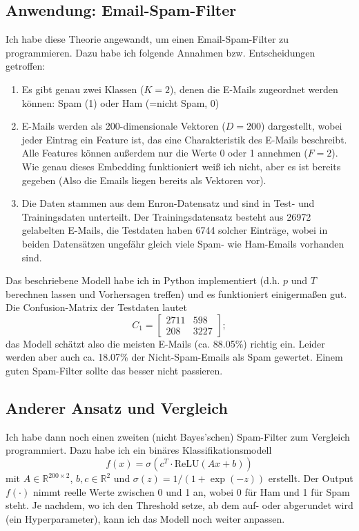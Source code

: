 \documentclass{article}
\begin{document}
\subsection{Anwendung: Email-Spam-Filter}
Ich habe diese Theorie angewandt, um einen Email-Spam-Filter zu programmieren. Dazu habe ich folgende Annahmen bzw. Entscheidungen getroffen:\begin{enumerate}
    \item Es gibt genau zwei Klassen (\(K=2\)), denen die E-Mails zugeordnet werden können: Spam (1) oder Ham (=nicht Spam, 0)
    \item E-Mails werden als 200-dimensionale Vektoren (\(D=200\)) dargestellt, wobei jeder Eintrag ein Feature ist, das eine Charakteristik des E-Mails beschreibt. Alle Features können außerdem nur die Werte 0 oder 1 annehmen (\(F=2\)). Wie genau dieses Embedding funktioniert weiß ich nicht, aber es ist bereits gegeben (Also die Emails liegen bereits als Vektoren vor).
    \item Die Daten stammen aus dem Enron-Datensatz und sind in Test- und Trainingsdaten unterteilt. Der Trainingsdatensatz besteht aus 26972 gelabelten E-Mails, die Testdaten haben 6744 solcher Einträge, wobei in beiden Datensätzen ungefähr gleich viele Spam- wie Ham-Emails vorhanden sind.
\end{enumerate}
Das beschriebene Modell habe ich in Python implementiert (d.h. \(p\) und \(T\) berechnen lassen und Vorhersagen treffen) und es funktioniert einigermaßen gut. Die Confusion-Matrix der Testdaten lautet\[
C_1=\begin{bmatrix}
    2711&598\\208&3227
\end{bmatrix};
\]das Modell schätzt also die meisten E-Mails (ca. 88.05\%) richtig ein. Leider werden aber auch ca. 18.07\% der Nicht-Spam-Emails als Spam gewertet. Einem guten Spam-Filter sollte das besser nicht passieren.

\subsection{Anderer Ansatz und Vergleich}
Ich habe dann noch einen zweiten (nicht Bayes'schen) Spam-Filter zum Vergleich programmiert. Dazu habe ich ein binäres Klassifikationsmodell\[
    f(x)=\sigma(c^T\cdot \text{ReLU}(Ax+b))
\]mit \(A\in\mathbb R^{200\times2}\), \(b,c\in\mathbb R^2\) und \(\sigma(z)=1/(1+\exp(-z))\) erstellt. Der Output \(f(\cdot)\) nimmt reelle Werte zwischen 0 und 1 an, wobei 0 für Ham und 1 für Spam steht. Je nachdem, wo ich den Threshold setze, ab dem auf- oder abgerundet wird (ein Hyperparameter), kann ich das Modell noch weiter anpassen.
\end{document}
